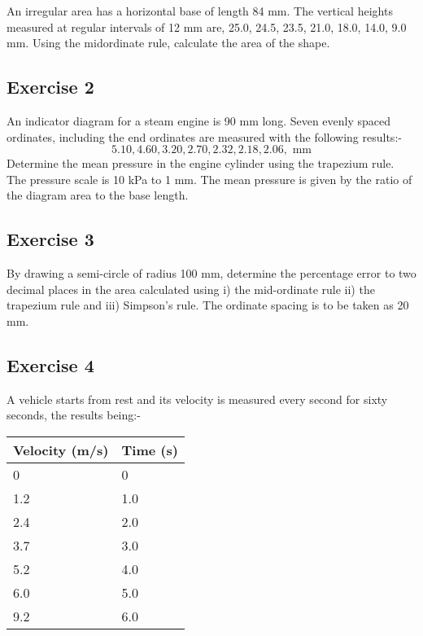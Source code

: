 \documentclass[
  11pt,
  oneside]{book}
\newcommand{\slide}{}
\theoremstyle{definition}
\theoremstyle{definition}
\theoremstyle{definition}
\theoremstyle{definition}
\theoremstyle{remark}
\begin{document}
An irregular area has a horizontal base of length 84 mm. The vertical heights measured at regular intervals of 12 mm are, 25.0, 24.5, 23.5, 21.0, 18.0, 14.0, 9.0 mm. Using the midordinate rule, calculate the area of the shape.

\slide

\subsection*{Exercise 2}\label{exercise-2-7}

An indicator diagram for a steam engine is 90 mm long. Seven evenly spaced ordinates, including the end ordinates are measured with the following results:-
\[
5.10, 4.60, 3.20, 2.70, 2.32, 2.18, 2.06, \text{ mm}
\]
Determine the mean pressure in the engine cylinder using the trapezium rule. The pressure scale is 10 kPa to 1 mm. The mean pressure is given by the ratio of the diagram area to the base length.

\slide

\subsection*{Exercise 3}\label{exercise-3-5}

By drawing a semi-circle of radius 100 mm, determine the percentage error to two decimal places in the area calculated using i) the mid-ordinate rule ii) the trapezium rule and iii) Simpson's rule. The ordinate spacing is to be taken as 20 mm.

\slide

\subsection*{Exercise 4}\label{exercise-4-4}

A vehicle starts from rest and its velocity is measured every second for sixty seconds, the results being:-

\begin{tabular}{l|l}
\hline
Velocity (m/s) & Time (s)\\
\hline
0 & 0\\
\hline
1.2 & 1.0\\
\hline
2.4 & 2.0\\
\hline
3.7 & 3.0\\
\hline
5.2 & 4.0\\
\hline
6.0 & 5.0\\
\hline
9.2 & 6.0\\
\hline
\end{tabular}
\end{document}
